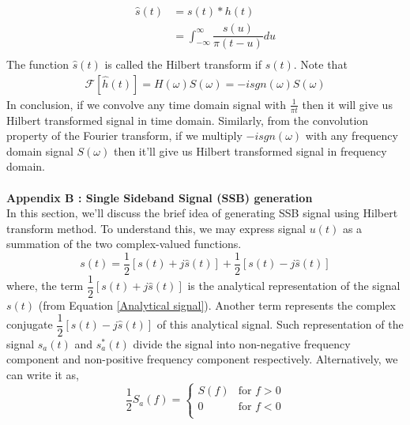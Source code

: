 \begin{equation}
\begin{split}
\hat{s}(t)&=s(t) * h(t)\\
		  &=\int_{-\infty}^{\infty} \dfrac{s(u)}{\pi(t-u)}du\\
\end{split}
\label{}
\end{equation}
The function $\hat{s}(t)$ is called the Hilbert transform if $s(t)$. Note that
\begin{equation}
\begin{split}
\mathcal{F}[\hat{h}(t)]=H(\omega)S(\omega)=-isgn(\omega)S(\omega)
\end{split}
\label{}
\end{equation}
In conclusion, if we convolve any time domain signal with $\frac{1}{\pi t}$ then it will give us Hilbert transformed signal in time domain. Similarly, from the convolution property of the Fourier transform, if we multiply $-isgn(\omega)$ with any frequency domain signal $S(\omega)$ then it'll give us Hilbert transformed signal in frequency domain.
\\
\\
\textbf{Appendix B : Single Sideband Signal (SSB) generation}\\
In this section, we'll discuss the brief idea of generating SSB signal using Hilbert transform method. To understand this, we may express signal $u(t)$ as a summation of the two complex-valued functions.
\begin{equation}
s(t)=\dfrac{1}{2}[s(t)+j\hat{s}(t)]+\dfrac{1}{2}[s(t)-j\hat{s}(t)]
\label{}
\end{equation}
where, the term $\dfrac{1}{2}[s(t)+j\hat{s}(t)]$ is the analytical representation of the signal $s(t)$ (from Equation \ref{Analytical signal}). Another term represents the complex conjugate $\dfrac{1}{2}[s(t)-j\hat{s}(t)]$ of this analytical signal. Such representation of the signal ${s_a}(t)$ and ${s_a^*}(t)$ divide the signal into non-negative frequency component and non-positive frequency component respectively. Alternatively, we can write it as,
\begin{equation}
\dfrac{1}{2}{S_a}(f) = \begin{cases}
S(f) &\text{for $f>0$}\\
0    &\text{for $f<0$}\\
\end{cases}
\end{equation}
